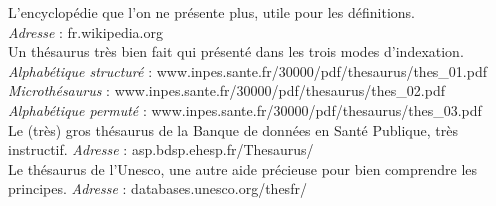 \documentclass[a4paper, 12pt]{report}
\begin{document}
\renewcommand\bibname{Sitographie}%
\begin{thebibliography}{2}
	L'encyclopédie que l'on ne présente plus, utile pour les définitions.\\
	\emph{Adresse} : fr.wikipedia.org
	~\\
	Un thésaurus très bien fait qui présenté dans les trois modes d'indexation.\\
	\emph{Alphabétique structuré} : www.inpes.sante.fr/30000/pdf/thesaurus/thes\_01.pdf\\
	\emph{Microthésaurus} : www.inpes.sante.fr/30000/pdf/thesaurus/thes\_02.pdf\\
	\emph{Alphabétique permuté} : www.inpes.sante.fr/30000/pdf/thesaurus/thes\_03.pdf
	~\\
	Le (très) gros thésaurus de la Banque de données en Santé Publique, très instructif.
	\emph{Adresse} : asp.bdsp.ehesp.fr/Thesaurus/
	~\\
	Le thésaurus de l'Unesco, une autre aide précieuse pour bien comprendre les principes.
	\emph{Adresse} : databases.unesco.org/thesfr/
	~\\
\end{thebibliography}
\end{document}
